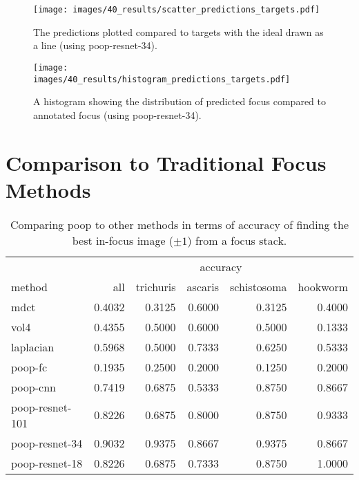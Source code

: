 \begin{figure}
    \centering
    \texttt{[image: images/40\_results/scatter\_predictions\_targets.pdf]}
    \caption{The predictions plotted compared to targets with the ideal drawn as a line (using \acs{poop}-\acs{resnet}-34).}
    \label{fig:Results:ScatterPredictedTarget}
\end{figure}
\begin{figure}
    \centering
    \texttt{[image: images/40\_results/histogram\_predictions\_targets.pdf]}
    \caption{A histogram showing the distribution of predicted focus compared to annotated focus (using \acs{poop}-\acs{resnet}-34).}
    \label{fig:Results:HistogramPredictedTarget}
\end{figure}


\section{Comparison to Traditional Focus Methods}
\label{sec:Results:TraditionalFocusMethods}


\begin{table}
    \centering
    \caption{Comparing \acs{poop} to other methods in terms of accuracy of finding the best in-focus image ($\pm 1$) from a focus stack.}
    \begin{tabular}{|l|rrrrr|}
        \hline
        \multicolumn{1}{|c}{} & \multicolumn{5}{|c|}{accuracy} \\
        method            & all & trichuris & ascaris & schistosoma & hookworm \\
        \hline
        \acs{mdct}      & 0.4032 & 0.3125 & 0.6000 & 0.3125 & 0.4000 \\
        \acs{vol4}      & 0.4355 & 0.5000 & 0.6000 & 0.5000 & 0.1333 \\
        \acs{laplacian} & 0.5968 & 0.5000 & 0.7333 & 0.6250 & 0.5333 \\
        \hline
        \acs{poop}-\acs{fc} & 0.1935 & 0.2500 & 0.2000 & 0.1250 & 0.2000 \\
        \acs{poop}-\acs{cnn}            & 0.7419 & 0.6875 & 0.5333 & 0.8750 & 0.8667 \\
        \acs{poop}-\acs{resnet}-101      & 0.8226 & 0.6875 & 0.8000 & 0.8750 & 0.9333 \\
        \acs{poop}-\acs{resnet}-34       & 0.9032 & 0.9375 & 0.8667 & 0.9375 & 0.8667 \\
        \acs{poop}-\acs{resnet}-18       & 0.8226 & 0.6875 & 0.7333 & 0.8750 & 1.0000 \\ 
        \hline
    \end{tabular}
    \label{tab:Results:Comparison:RelatedWorks:Accuracy}
\end{table}

